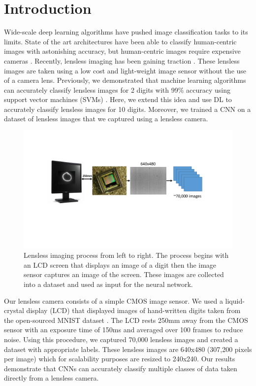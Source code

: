 \documentclass{osa-article}
\begin{document}
\section{Introduction}
Wide-scale deep learning algorithms have pushed image classification tasks to its limits. State of the art architectures have been able to classify human-centric images with astonishing accuracy, but human-centric images require expensive cameras \cite{DBLP:journals/corr/SimonyanZ14a, DBLP:journals/corr/SzegedyIV16}. Recently, lensless imaging has been gaining traction \cite{DBLP:journals/corr/AsifASVB15, Gill:13, DBLP:journals/corr/KimIPM17}. These lensless images are taken using a low cost and light-weight image sensor without the use of a camera lens. Previously, we demonstrated that machine learning algorithms can accurately classify lensless images for 2 digits with 99\% accuracy using support vector machines (SVMs) \cite{DBLP:journals/corr/abs-1709-00408}. Here, we extend this idea and use DL to accurately classify lensless images for 10 digits. Moreover, we trained a CNN on a dataset of lensless images that we captured using a lensless camera.
%
\begin{figure}[!ht]
\centering
\includegraphics[width=1\linewidth]{imagingprocess}
\caption{Lensless imaging process from left to right. The process begins with an LCD screen that displays an image of a digit then the image sensor captures an image of the screen. These images are collected into a dataset and used as input for the neural network.}\label{imagingprocess}
\end{figure}
%
Our lensless camera consists of a simple CMOS image sensor. We used a liquid-crystal display (LCD) that displayed images of hand-written digits taken from the open-sourced MNIST dataset \cite{lecun-mnisthandwrittendigit-2010}. The LCD rests 250mm away from the CMOS sensor with an exposure time of 150ms and averaged over 100 frames to reduce noise. Using this procedure, we captured 70,000 lensless images and created a dataset with appropriate labels. These lensless images are 640x480 (307,200 pixels per image) which for scalability purposes are resized to 240x240.
%
Our results demonstrate that CNNs can accurately classify multiple classes of data taken directly from a lensless camera.
%
\end{document}
